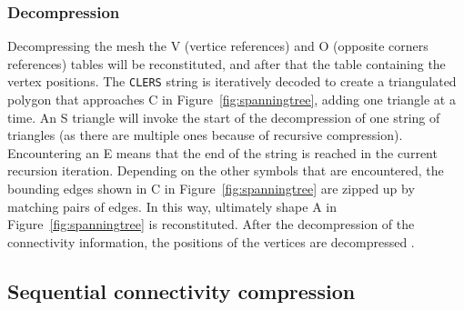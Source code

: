\subsubsection{Decompression}
Decompressing the mesh the V (vertice references) and O (opposite corners references) tables will be reconstituted, and after that the table containing the vertex positions.
The \texttt{CLERS} string is iteratively decoded to create a triangulated polygon that approaches C in Figure~\ref{fig:spanningtree}, adding one triangle at a time. 
An S triangle will invoke the start of the decompression of one string of triangles (as there are multiple ones because of recursive compression).
Encountering an E means that the end of the string is reached in the current recursion iteration.
Depending on the other symbols that are encountered, the bounding edges shown in C in Figure~\ref{fig:spanningtree} are zipped up by matching pairs of edges.
In this way, ultimately shape A in Figure~\ref{fig:spanningtree} is reconstituted.
After the decompression of the connectivity information, the positions of the vertices are decompressed \citep{rossignac2003edgebreaker}.









\subsection{Sequential connectivity compression}
\label{sec:seqconnectivity}

